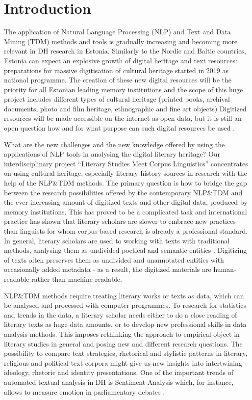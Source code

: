 \documentclass[runningheads]{llncs}
\begin{document}
\section{Introduction}

The application of Natural Language Processing (NLP) and Text and Data Mining (TDM) methods and tools is gradually increasing and becoming more relevant in DH research in Estonia. Similarly to the Nordic and Baltic countries, Estonia can expect an explosive growth of digital heritage and text resources: preparations for massive digitisation of cultural heritage started in 2019 as national programme. The creation of these new digital resources will be the priority for all Estonian leading memory institutions and the scope of this huge project includes different types of cultural heritage (printed books, archival documents, photo and film heritage, ethnographic and fine art objects) \cite{digiteerimine,viireslaak18} Digitized resources will be made accessible on the internet as open data, but it is still an open question how and for what purpose can such digital resources be used \cite{laakviires}. 

What are the new challenges and the new knowledge offered by using the applications of NLP tools in analysing the digital literary heritage? Our interdisciplinary project “Literary Studies Meet Corpus Linguistics” concentrates on using cultural heritage, especially literary history sources in research with the help of the NLP\&TDM methods. The primary question is how to bridge the gap between the research possibilities offered by the contemporary NLP\&TDM and the ever increasing amount of digitized texts and other digital data, produced by memory institutions. This has proved to be a complicated task and international practice has shown that literary scholars are slower to embrace new practices than linguists for whom corpus-based research is already a professional standard. In general, literary scholars are used to working with texts with traditional methods, analysing them as undivided poetical and semantic entities \cite{viireslaak18}. Digitizing of texts often preserves them as undivided and unannotated entities with occasionally added metadata - as a result, the digitized materials are human-readable rather than machine-readable.

NLP\&TDM methods require treating literary works or texts as data, which can be analysed and processed with computer programmes. To research for statistics and trends in the data, a literary scholar needs either to do a close reading of literary texts as huge data amounts, or to develop new professional skills in data analysis methods. This imposes rethinking the approach to empirical object in literary studies in general and posing new and different research questions. The possibility to compare text strategies, rhetorical and stylistic patterns in literary, religious and political text corpora might give us new insights into intertwining ideology, rhetoric and identity presentations. One of the important trends of automated textual analysis in DH is Sentiment Analysis which, for instance, allows to measure emotion in parliamentary debates \cite{Rheault2016}.
\end{document}
